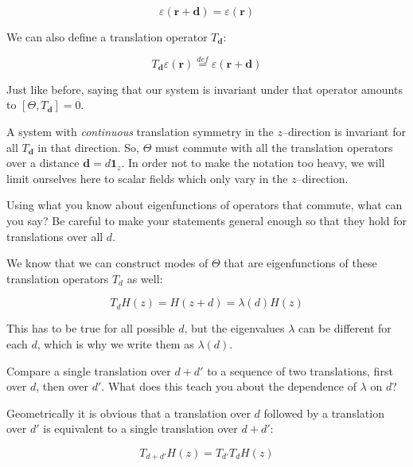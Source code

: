 \begin{equation}
\varepsilon ({\mathbf r} + {\mathbf d}) =  \varepsilon ({\mathbf r})
\end{equation} 

We can also define a translation operator $T_{\mathbf d}$:

\begin{equation}
T_{\mathbf d} \varepsilon ({\mathbf r}) \stackrel{def}{=} \varepsilon ({\mathbf r} + {\mathbf d})
\end{equation} 

Just like before, saying that our system is invariant under that operator amounts to $[\Theta, T_{\mathbf d}] = 0$.

A system with \emph{continuous} translation symmetry in the $z$--direction is invariant for all $T_{\mathbf d}$ in that direction. So, $\Theta$ must commute with all the translation operators over a distance ${\mathbf d} = d {\mathbf 1}_z$. In order not to make the notation too heavy, we will limit ourselves here to scalar fields which only vary in the $z$--direction.

\begin{cue}
  Using what you know about eigenfunctions of operators that commute, what can you say? Be careful to make your statements general enough so that they hold for translations over all ${d}$.
\end{cue}

We know that we can construct modes of $\Theta$ that are eigenfunctions of these translation operators $T_d$ as well:

\begin{equation}
T_d H(z) = H(z + d) = \lambda(d) H(z)
\end{equation} 

This has to be true for all possible $d$, but the eigenvalues $\lambda$ can be different for each $d$, which is why we write them as $\lambda(d)$. 

\begin{cue}
Compare a single translation over $d+d'$ to a sequence of two translations, first over $d$, then over $d'$. What does this teach you about the dependence of $\lambda$ on $d$?
\end{cue}

Geometrically it is obvious that a translation over $d$ followed by a translation over $d'$ is equivalent to a single translation over $d+d'$:

\begin{equation}
T_{d+d'}H(z) = T_{d'}T_{d}H(z)
\end{equation} 

